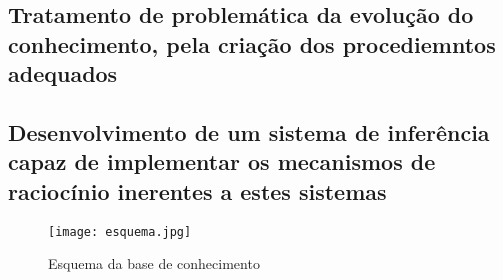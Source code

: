 \subsection{Tratamento de problemática da evolução do conhecimento, pela criação dos procediemntos adequados}


\subsection{Desenvolvimento de um sistema de inferência capaz de implementar os mecanismos de raciocínio inerentes a estes sistemas}

\begin{figure}[<+htpb+>]
	\centering
	\texttt{[image: esquema.jpg]}
	\caption{Esquema da base de conhecimento }
	\label{p3:fig:esquema1}
\end{figure}




